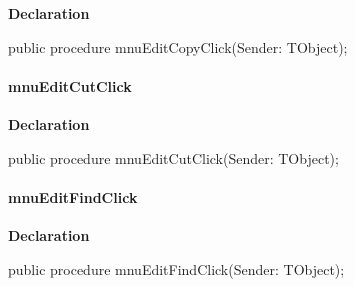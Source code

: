 \documentclass{report}
\newif\ifpdf
\begin{document}
\label{editor.TFrmEditor-mnuEditCopyClick}
\begin{list}{}{
\setlength{\itemindent}{0cm}
\setlength{\listparindent}{0cm}
\setlength{\leftmargin}{\evensidemargin}
\addtolength{\leftmargin}{\tmplength}
\settowidth{\labelsep}{X}
\addtolength{\leftmargin}{\labelsep}
\setlength{\labelwidth}{\tmplength}
}
\item[\textbf{Declaration}\hfill]
\ifpdf
\begin{flushleft}
\fi
\begin{ttfamily}
public procedure mnuEditCopyClick(Sender: TObject);\end{ttfamily}

\ifpdf
\end{flushleft}
\fi

\end{list}
\paragraph*{mnuEditCutClick}\hspace*{\fill}

\label{editor.TFrmEditor-mnuEditCutClick}
\begin{list}{}{
\setlength{\itemindent}{0cm}
\setlength{\listparindent}{0cm}
\setlength{\leftmargin}{\evensidemargin}
\addtolength{\leftmargin}{\tmplength}
\settowidth{\labelsep}{X}
\addtolength{\leftmargin}{\labelsep}
\setlength{\labelwidth}{\tmplength}
}
\item[\textbf{Declaration}\hfill]
\ifpdf
\begin{flushleft}
\fi
\begin{ttfamily}
public procedure mnuEditCutClick(Sender: TObject);\end{ttfamily}

\ifpdf
\end{flushleft}
\fi

\end{list}
\paragraph*{mnuEditFindClick}\hspace*{\fill}

\label{editor.TFrmEditor-mnuEditFindClick}
\begin{list}{}{
\setlength{\itemindent}{0cm}
\setlength{\listparindent}{0cm}
\setlength{\leftmargin}{\evensidemargin}
\addtolength{\leftmargin}{\tmplength}
\settowidth{\labelsep}{X}
\addtolength{\leftmargin}{\labelsep}
\setlength{\labelwidth}{\tmplength}
}
\item[\textbf{Declaration}\hfill]
\ifpdf
\begin{flushleft}
\fi
\begin{ttfamily}
public procedure mnuEditFindClick(Sender: TObject);\end{ttfamily}

\ifpdf
\end{flushleft}
\fi

\end{list}
\end{document}
